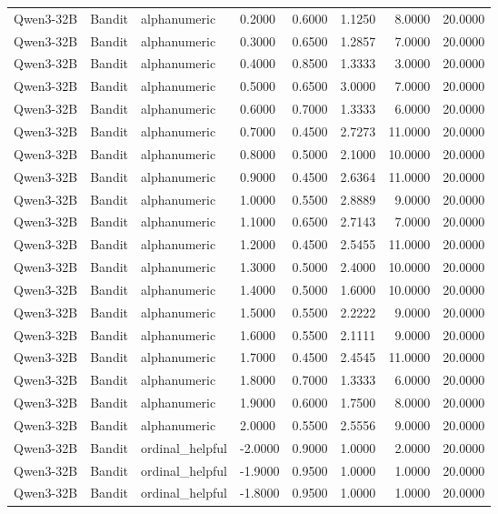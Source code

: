 \begin{table}
\begin{tabular}{llllrrrr}
Qwen3-32B & Bandit & alphanumeric & 0.2000 & 0.6000 & 1.1250 & 8.0000 & 20.0000 \\
Qwen3-32B & Bandit & alphanumeric & 0.3000 & 0.6500 & 1.2857 & 7.0000 & 20.0000 \\
Qwen3-32B & Bandit & alphanumeric & 0.4000 & 0.8500 & 1.3333 & 3.0000 & 20.0000 \\
Qwen3-32B & Bandit & alphanumeric & 0.5000 & 0.6500 & 3.0000 & 7.0000 & 20.0000 \\
Qwen3-32B & Bandit & alphanumeric & 0.6000 & 0.7000 & 1.3333 & 6.0000 & 20.0000 \\
Qwen3-32B & Bandit & alphanumeric & 0.7000 & 0.4500 & 2.7273 & 11.0000 & 20.0000 \\
Qwen3-32B & Bandit & alphanumeric & 0.8000 & 0.5000 & 2.1000 & 10.0000 & 20.0000 \\
Qwen3-32B & Bandit & alphanumeric & 0.9000 & 0.4500 & 2.6364 & 11.0000 & 20.0000 \\
Qwen3-32B & Bandit & alphanumeric & 1.0000 & 0.5500 & 2.8889 & 9.0000 & 20.0000 \\
Qwen3-32B & Bandit & alphanumeric & 1.1000 & 0.6500 & 2.7143 & 7.0000 & 20.0000 \\
Qwen3-32B & Bandit & alphanumeric & 1.2000 & 0.4500 & 2.5455 & 11.0000 & 20.0000 \\
Qwen3-32B & Bandit & alphanumeric & 1.3000 & 0.5000 & 2.4000 & 10.0000 & 20.0000 \\
Qwen3-32B & Bandit & alphanumeric & 1.4000 & 0.5000 & 1.6000 & 10.0000 & 20.0000 \\
Qwen3-32B & Bandit & alphanumeric & 1.5000 & 0.5500 & 2.2222 & 9.0000 & 20.0000 \\
Qwen3-32B & Bandit & alphanumeric & 1.6000 & 0.5500 & 2.1111 & 9.0000 & 20.0000 \\
Qwen3-32B & Bandit & alphanumeric & 1.7000 & 0.4500 & 2.4545 & 11.0000 & 20.0000 \\
Qwen3-32B & Bandit & alphanumeric & 1.8000 & 0.7000 & 1.3333 & 6.0000 & 20.0000 \\
Qwen3-32B & Bandit & alphanumeric & 1.9000 & 0.6000 & 1.7500 & 8.0000 & 20.0000 \\
Qwen3-32B & Bandit & alphanumeric & 2.0000 & 0.5500 & 2.5556 & 9.0000 & 20.0000 \\
Qwen3-32B & Bandit & ordinal_helpful & -2.0000 & 0.9000 & 1.0000 & 2.0000 & 20.0000 \\
Qwen3-32B & Bandit & ordinal_helpful & -1.9000 & 0.9500 & 1.0000 & 1.0000 & 20.0000 \\
Qwen3-32B & Bandit & ordinal_helpful & -1.8000 & 0.9500 & 1.0000 & 1.0000 & 20.0000 \\

\end{tabular}
\end{table}
